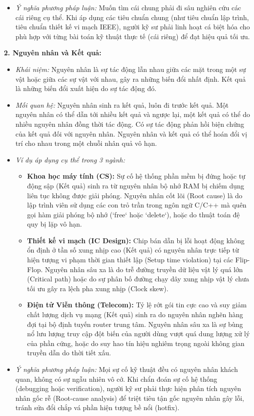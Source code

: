 \documentclass[12pt,a4paper]{article}
\begin{document}
{\begin{itemize}
\begin{itemize}
    \end{itemize}
    \item \textit{Ý nghĩa phương pháp luận:} Muốn tìm cái chung phải đi sâu nghiên cứu các cái riêng cụ thể. Khi áp dụng các tiêu chuẩn chung (như tiêu chuẩn lập trình, tiêu chuẩn thiết kế vi mạch IEEE), người kỹ sư phải linh hoạt cá biệt hóa cho phù hợp với từng bài toán kỹ thuật thực tế (cái riêng) để đạt hiệu quả tối ưu.
\end{itemize}

\noindent
\textbf{2. Nguyên nhân và Kết quả:}
\begin{itemize}
    \item \textit{Khái niệm:} Nguyên nhân là sự tác động lẫn nhau giữa các mặt trong một sự vật hoặc giữa các sự vật với nhau, gây ra những biến đổi nhất định. Kết quả là những biến đổi xuất hiện do sự tác động đó.
    \item \textit{Mối quan hệ:} Nguyên nhân sinh ra kết quả, luôn đi trước kết quả. Một nguyên nhân có thể dẫn tới nhiều kết quả và ngược lại, một kết quả có thể do nhiều nguyên nhân đồng thời tác động. Có sự tác động phản hồi biện chứng của kết quả đối với nguyên nhân. Nguyên nhân và kết quả có thể hoán đổi vị trí cho nhau trong một chuỗi nhân quả vô hạn.
    \item \textit{Ví dụ áp dụng cụ thể trong 3 ngành:}
    \begin{itemize}
        \item \textbf{Khoa học máy tính (CS):} Sự cố hệ thống phần mềm bị đứng hoặc tự động sập (Kết quả) sinh ra từ nguyên nhân bộ nhớ RAM bị chiếm dụng liên tục không được giải phóng. Nguyên nhân cốt lõi (Root cause) là do lập trình viên sử dụng các con trỏ trần trong ngôn ngữ C/C++ mà quên gọi hàm giải phóng bộ nhớ (`free` hoặc `delete`), hoặc do thuật toán đệ quy bị lặp vô hạn.
        \item \textbf{Thiết kế vi mạch (IC Design):} Chip bán dẫn bị lỗi hoạt động không ổn định ở tần số xung nhịp cao (Kết quả) có nguyên nhân trực tiếp từ hiện tượng vi phạm thời gian thiết lập (Setup time violation) tại các Flip-Flop. Nguyên nhân sâu xa là do trễ đường truyền dữ liệu vật lý quá lớn (Critical path) hoặc do sự phân bố đường chạy dây xung nhịp vật lý chưa tối ưu gây ra lệch pha xung nhịp (Clock skew).
        \item \textbf{Điện tử Viễn thông (Telecom):} Tỷ lệ rớt gói tin cực cao và suy giảm chất lượng dịch vụ mạng (Kết quả) sinh ra do nguyên nhân nghẽn hàng đợi tại bộ định tuyến router trung tâm. Nguyên nhân sâu xa là sự bùng nổ lưu lượng truy cập đột biến của người dùng vượt quá dung lượng xử lý của phần cứng, hoặc do suy hao tín hiệu nghiêm trọng ngoài không gian truyền dẫn do thời tiết xấu.
    \end{itemize}
    \item \textit{Ý nghĩa phương pháp luận:} Mọi sự cố kỹ thuật đều có nguyên nhân khách quan, không có sự ngẫu nhiên vô cớ. Khi chẩn đoán sự cố hệ thống (debugging hoặc verification), người kỹ sư phải thực hiện phân tích nguyên nhân gốc rễ (Root-cause analysis) để triệt tiêu tận gốc nguyên nhân gây lỗi, tránh sửa đổi chắp vá phần hiện tượng bề nổi (hotfix).
\end{itemize}

}
\end{document}
